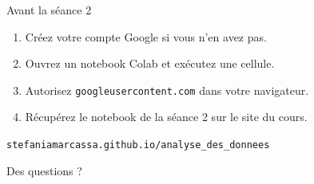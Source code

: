 \documentclass[10pt,aspectratio=169]{beamer}
\begin{document}
\begin{frame}{Avant la séance 2}
\begin{enumerate}
  \item Créez votre compte Google si vous n'en avez pas.
  \item Ouvrez un notebook Colab et exécutez une cellule.
  \item Autorisez \texttt{googleusercontent.com} dans votre navigateur.
  \item Récupérez le notebook de la séance 2 sur le site du cours.
\end{enumerate}

\vspace{2em}
\begin{center}
\large \texttt{stefaniamarcassa.github.io/analyse\_des\_donnees}
\end{center}
\end{frame}

\begin{frame}[standout]
Des questions ?
\end{frame}
\end{document}
